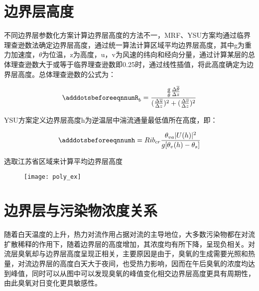 \section{边界层高度}

不同边界层参数化方案计算边界层高度的方法不一，MRF、YSU方案均通过临界理查逊数法确定边界层高度，通过统一算法计算区域平均边界层高度，其中g为重力加速度，$\theta$为位温，z为高度，u，v为风速的纬向和经向分量，通过计算某层的总体理查逊数大于或等于临界理查逊数即0.25时，通过线性插值，将此高度确定为边界层高度。总体理查逊数的公式为：

\begin{equation}
    \adddotsbeforeeqnnum%
		R_{b} = \frac{\frac{g}{\overline{\theta}}\frac{\Delta \overline{\theta}}{\Delta z}}{(\frac{\Delta \overline{u}}{\Delta z})^2 + (\frac{\Delta \overline{v}}{\Delta z})^2}
\end{equation}

YSU方案定义边界层高度h为逆温层中湍流通量最低值所在高度，即：

\begin{equation}
    \adddotsbeforeeqnnum%
		h = Rib_{cr} \frac{\theta_{va}|U(h)|^{2}}{g[\theta_{v}(h)-\theta_{s}]}
\end{equation}

选取江苏省区域来计算平均边界层高度


\begin{figure}[!htbp]
    \centering
    \texttt{[image: poly\_ex]}
		\label{fig:poly_ex}
\end{figure}

\section{边界层与污染物浓度关系}

随着白天温度的上升，热力对流作用占据对流的主导地位，大多数污染物都在对流扩散稀释的作用下，随着边界层的高度增加，其浓度均有所下降，呈现负相关。对流层臭氧却与边界层高度呈现正相关，主要原因是由于，臭氧的生成需要光照和热量，对流边界层的高度白天大于夜间，也受热力影响，因而在午后臭氧的浓度均达到峰值，同时可以从图中可以发现臭氧的峰值变化相交边界层高度更具有周期性，由此臭氧对日变化更具敏感性。

